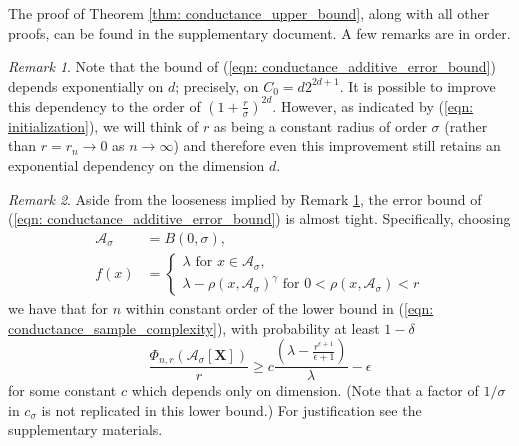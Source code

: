 \documentclass{article}
\newcommand{\1}{\mathbf{1}}
\newcommand{\Aset}{\mathcal{A}}
\newcommand{\Asig}{\Aset_{\sigma}}
\theoremstyle{aldenthm}
\theoremstyle{remark}
\newtheorem{remark}{Remark}
\begin{document}
The proof of Theorem \ref{thm: conductance_upper_bound}, along with all other proofs, can be found in the supplementary document. A few remarks are in order. 
\begin{remark}
	\label{rem: exp_in_d}
	Note that the bound of (\ref{eqn: conductance_additive_error_bound}) depends exponentially on $d$; precisely, on $C_0 = d2^{2d +1}$. It is possible to improve this dependency to the order of $(1 + \frac{r}{\sigma})^{2d}$. However, as indicated by (\ref{eqn: initialization}), we will think of $r$ as being a constant radius of order $\sigma$ (rather than $r = r_n \to 0$ as $n \to \infty$) and therefore even this improvement still retains an exponential dependency on the dimension $d$.
\end{remark}
\begin{remark}
	Aside from the looseness implied by Remark \ref{rem: exp_in_d}, the error bound of (\ref{eqn: conductance_additive_error_bound}) is almost tight. Specifically, choosing
	\begin{align*}
	\Asig & = B(0,\sigma), \\
	 f(x) & = 
	 \begin{cases}
	 \lambda \text{ for $x \in \Asig$}, \\
	 \lambda - \rho(x,\Asig)^{\gamma} \text{ for $0 < \rho(x,\Asig) < r$}
	 \end{cases}
	\end{align*}
	we have that for $n$ within constant order of the lower bound in (\ref{eqn: conductance_sample_complexity}), with probability at least $1 - \delta$
	\begin{equation*}
	\frac{\Phi_{n,r}(\Asig[\mathbf{X}])}{r} \geq c \frac{(\lambda - \frac{r^{\epsilon+1}}{\epsilon+1})}{\lambda} - \epsilon
	\end{equation*}
	for some constant $c$ which depends only on dimension. (Note that a factor of $1 / \sigma$ in $c_{\sigma}$ is not replicated in this lower bound.) For justification see the supplementary materials.
\end{remark}
\end{document}
